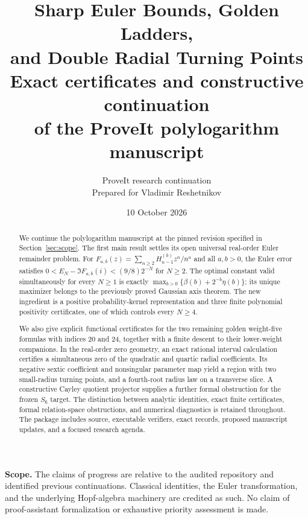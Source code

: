\documentclass[11pt]{article}
\title{\color{ResearchNavy}\bfseries Sharp Euler Bounds, Golden Ladders,\\
 and Double Radial Turning Points\\[8pt]
 \large\normalfont Exact certificates and constructive continuation\\
 of the ProveIt polylogarithm manuscript}
\author{ProveIt research continuation\\
 \normalsize Prepared for Vladimir Reshetnikov}
\date{10 October 2026}
\theoremstyle{definition}
\theoremstyle{remark}
\begin{document}
\maketitle
\begin{abstract}
We continue the polylogarithm manuscript at the pinned revision specified
in Section~\ref{sec:scope}. The first main result settles its open universal real-order
Euler remainder problem. For
$F_{a,b}(z)=\sum_{n\ge2}H_{n-1}^{(b)}z^n/n^a$ and all $a,b>0$, the
Euler error satisfies $0<E_N-\Im F_{a,b}(i)<(9/8)2^{-N}$ for $N\ge2$.
The optimal constant valid simultaneously for every $N\ge1$ is exactly
$\max_{b>0}\{\beta(b)+2^{-b}\eta(b)\}$; its unique maximizer belongs to
the previously proved Gaussian axis theorem. The new ingredient is a
positive probability-kernel representation and three finite polynomial
positivity certificates, one of which controls every $N\ge4$.

We also give explicit functional certificates for the two remaining
golden weight-five formulas with indices 20 and 24, together with a
finite descent to their lower-weight companions. In the real-order zero
geometry, an exact rational interval calculation certifies a simultaneous
zero of the quadratic and quartic radial coefficients. Its negative
sextic coefficient and nonsingular parameter map yield a region with two
small-radius turning points, and a fourth-root radius law on a transverse
slice. A constructive Cayley quotient projector supplies a further
formal obstruction for the frozen $S_6$ target. The distinction between
analytic identities, exact finite certificates, formal relation-space
obstructions, and numerical diagnostics is retained throughout. The
package includes source, executable verifiers, exact records, proposed
manuscript updates, and a focused research agenda.
\end{abstract}
\vfill
\noindent\textbf{Scope.} The claims of progress are relative to the audited
repository and identified previous continuations. Classical identities,
the Euler transformation, and the underlying Hopf-algebra machinery are
credited as such. No claim of proof-assistant formalization or exhaustive
priority assessment is made.
\newpage
\tableofcontents
\newpage







\end{document}
